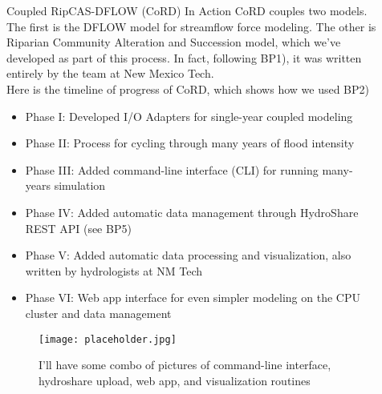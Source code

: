 \documentclass[final]{beamer}
\newlength{\sepwid}
\newlength{\onecolwid}
\newlength{\twocolwid}
\begin{document}
\begin{frame}[t]
\begin{columns}[t]
\begin{column}{\onecolwid}


\end{column} %

\begin{column}{\sepwid}\end{column} %

\begin{column}{\twocolwid} %


\begin{alertblock}{Coupled RipCAS-DFLOW (CoRD) In Action}
    CoRD couples two models. The first is the DFLOW model for streamflow force modeling. The other is Riparian Community Alteration and
    Succession model, which we've developed as part of this process. In fact, following BP1), it was written entirely by the
    team at New Mexico Tech. \\
    Here is the timeline of progress of CoRD, which shows how we used BP2)
    \begin{itemize}
        \item Phase I: Developed I/O Adapters for single-year coupled modeling
        \item Phase II: Process for cycling through many years of flood intensity
        \item Phase III: Added command-line interface (CLI) for running many-years simulation
        \item Phase IV: Added automatic data management through HydroShare\cite{Horsburgh2016} REST API (see BP5)
        \item Phase V: Added automatic data processing and visualization, also written by hydrologists at NM Tech
        \item Phase VI: Web app interface for even simpler modeling on the CPU cluster and data management
    \end{itemize}


    \begin{figure}
        \texttt{[image: placeholder.jpg]}
        \caption{I'll have some combo of pictures of command-line interface, hydroshare upload, web app, and visualization routines}
    \end{figure}
\end{alertblock}


\end{column}
\end{columns}
\end{frame}
\end{document}
